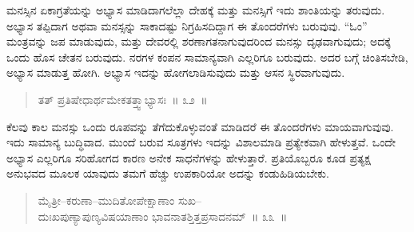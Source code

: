 \vspace{-0.3cm}


\vspace{0.3cm}

ಮನಸ್ಸಿನ ಏಕಾಗ್ರತೆಯನ್ನು ಅಭ್ಯಾಸ ಮಾಡಿದಾಗಲೆಲ್ಲಾ ದೇಹಕ್ಕೆ ಮತ್ತು ಮನಸ್ಸಿಗೆ ಇದು ಶಾಂತಿಯನ್ನು ತರುವುದು. ಅಭ್ಯಾಸ ತಪ್ಪಿದಾಗ ಅಥವಾ ಮನಸ್ಸನ್ನು ಸಾಕಾದಷ್ಟು ನಿಗ್ರಹಿಸದಿದ್ದಾಗ ಈ ತೊಂದರೆಗಳು ಬರುವುವು. “ಓಂ” ಮಂತ್ರವನ್ನು ಜಪ ಮಾಡುವುದು, ಮತ್ತು ದೇವರಲ್ಲಿ ಶರಣಾಗತನಾಗುವುದರಿಂದ ಮನಸ್ಸು ದೃಢವಾಗುವುದು; ಅದಕ್ಕೆ ಒಂದು ಹೊಸ ಚೇತನ ಬರುವುದು. ನರಗಳ ಕಂಪನ ಸಾಮಾನ್ಯವಾಗಿ ಎಲ್ಲರಿಗೂ ಬರುವುದು. ಅದರ ಬಗ್ಗೆ ಚಿಂತಿಸಬೇಡಿ, ಅಭ್ಯಾಸ ಮಾಡುತ್ತ ಹೋಗಿ. ಅಭ್ಯಾಸ ಇದನ್ನು ಹೋಗಲಾಡಿಸುವುದು ಮತ್ತು ಆಸನ ಸ್ಥಿರವಾಗುವುದು. 


\begin{verse}
ತತ್​ ಪ್ರತಿಷೇಧಾರ್ಥಮೇಕತತ್ತ್ವಾಭ್ಯಾಸಃ~॥ ೩೨~॥
\end{verse}

\vspace{-0.33cm}


\eject

ಕೆಲವು ಕಾಲ ಮನಸ್ಸು ಒಂದು ರೂಪವನ್ನು ತೆಗೆದುಕೊಳ್ಳುವಂತೆ ಮಾಡಿದರೆ ಈ ತೊಂದರೆಗಳು ಮಾಯವಾಗುವುವು. ಇದು ಸಾಮಾನ್ಯ ಬುದ್ಧಿವಾದ. ಮುಂದೆ ಬರುವ ಸೂತ್ರಗಳು ಇದನ್ನು ವಿಶಾಲಮಾಡಿ ಪ್ರತ್ಯೇಕವಾಗಿ ಹೇಳುತ್ತವೆ. ಒಂದೇ ಅಭ್ಯಾಸ ಎಲ್ಲರಿಗೂ ಸರಿಹೋಗದ ಕಾರಣ ಅನೇಕ ಸಾಧನೆಗಳನ್ನು ಹೇಳುತ್ತಾರೆ. ಪ್ರತಿಯೊಬ್ಬರೂ ಕೂಡ ಪ್ರತ್ಯಕ್ಷ ಅನುಭವದ ಮೂಲಕ ಯಾವುದು ತಮಗೆ ಹೆಚ್ಚು ಉಪಕಾರಿಯೋ ಅದನ್ನು ಕಂಡುಹಿಡಿಯಬೇಕು. 

\vspace{-0.1cm}

\begin{verse}
ಮೈತ್ರೀ–ಕರುಣಾ–ಮುದಿತೋಪೇಕ್ಷಾಣಾಂ ಸುಖ–\\ದುಃಖಪುಣ್ಯಾಪುಣ್ಯವಿಷಯಾಣಾಂ ಭಾವನಾತಶ್ತಿತ್ತಪ್ರಸಾದನಮ್​~॥ ೩೩~॥
\end{verse}

\vspace{-0.4cm}


\vskip 0.2cm


